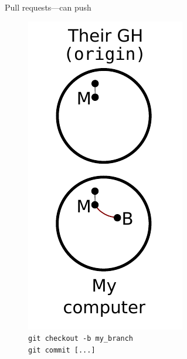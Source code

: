 \begin{frame}{Pull requests---can push}
  \begin{figure}
    \includegraphics{push_003.pdf}
    \\ \texttt{git checkout -b my\_branch}
    \\ \texttt{git commit [...]}
  \end{figure}
\end{frame}

